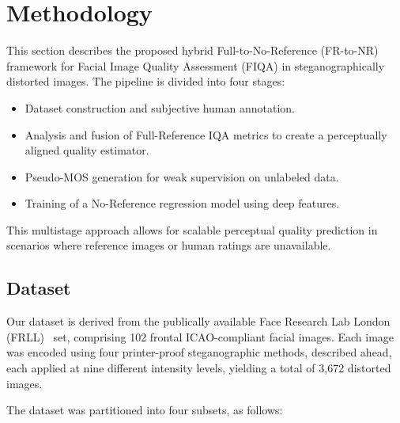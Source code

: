 \section{Methodology}

This section describes the proposed hybrid Full-to-No-Reference (FR-to-NR) framework for Facial Image Quality Assessment (FIQA) in steganographically distorted images. The pipeline is divided into four stages:

\begin{itemize}
    \item Dataset construction and subjective human annotation.
    \item Analysis and fusion of Full-Reference IQA metrics to create a perceptually aligned quality estimator.
    \item Pseudo-MOS generation for weak supervision on unlabeled data.
    \item Training of a No-Reference regression model using deep features.
\end{itemize}

This multistage approach allows for scalable perceptual quality prediction in scenarios where reference images or human ratings are unavailable.

\subsection{Dataset}

Our dataset is derived from the publically available Face Research Lab London (FRLL)~\cite{DeBruine2017} set, comprising 102 frontal ICAO-compliant facial images. Each image was encoded using four printer-proof steganographic methods, described ahead, each applied at nine different intensity levels, yielding a total of 3,672 distorted images.

The dataset was partitioned into four subsets, as follows:

